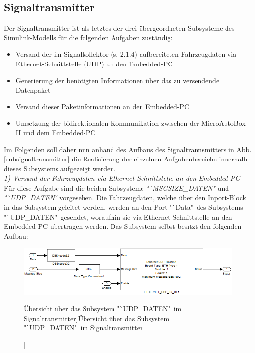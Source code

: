 \documentclass[fontsize = 12pt, paper = a4]{scrreprt}
\begin{document}
\newpage



\subsection{Signaltransmitter}
 
Der Signaltransmitter ist als letztes der drei übergeordneten Subsysteme des Simulink-Modells für die folgenden Aufgaben zuständig:

\begin{itemize}

\item Versand der im Signalkollektor (s. 2.1.4) aufbereiteten Fahrzeugdaten via Ethernet-Schnittstelle (UDP) an den Embedded-PC

\item Generierung der benötigten Informationen über das zu versendende Datenpaket

\item Versand dieser Paketinformationen an den Embedded-PC

\item Umsetzung der bidirektionalen Kommunikation zwischen der MicroAutoBox II und dem Embedded-PC

\end{itemize}

Im Folgenden soll daher nun anhand des Aufbaus des Signaltrannsmitters in Abb. \ref{subsignaltransmitter} die Realisierung der einzelnen Aufgabenbereiche innerhalb dieses Subsystems aufgezeigt werden. \\




\textit{1) Versand der Fahrzeugdaten via Ethernet-Schnittstelle an den Embedded-PC} \\

Für diese Aufgabe sind die beiden Subsysteme \textit{"`MSGSIZE\_DATEN"} und \textit{"`UDP\_DATEN"} vorgesehen. Die Fahrzeugdaten, welche über den Inport-Block in das Subsystem geleitet werden, werden an den Port "`Data"\ des Subsystems "`UDP\_DATEN"\ gesendet, woraufhin sie via Ethernet-Schnittstelle an den Embedded-PC übertragen werden. Das Subsystem selbst besitzt den folgenden Aufbau:

\begin{figure}[h]
\centering
\includegraphics[scale = 0.75]{subudpdaten}
\caption[Übersicht über das Subsystem "`UDP\_DATEN"\ im Signaltransmitter]{Übersicht über das Subsystem "`UDP\_DATEN"\ im Signaltransmitter}
\label{scdatenmotor}
\end{figure} 
\end{document}
